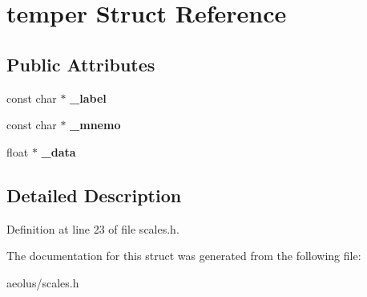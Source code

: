 \hypertarget{structtemper}{}\section{temper Struct Reference}
\label{structtemper}
\subsection*{Public Attributes}
\begin{DoxyCompactItemize}
\item 
\mbox{\label{structtemper_ad2527da094c3f5cefe69538eb09b8d20}} 
const char $\ast$ {\bfseries \+\_\+label}
\item 
\mbox{\label{structtemper_ab6ebb44627afada91dd72629ee89cb79}} 
const char $\ast$ {\bfseries \+\_\+mnemo}
\item 
\mbox{\label{structtemper_a43a5eeea7aaae3d5d7d09e824f072769}} 
float $\ast$ {\bfseries \+\_\+data}
\end{DoxyCompactItemize}


\subsection{Detailed Description}


Definition at line 23 of file scales.\+h.



The documentation for this struct was generated from the following file\+:\begin{DoxyCompactItemize}
\item 
aeolus/scales.\+h\end{DoxyCompactItemize}
